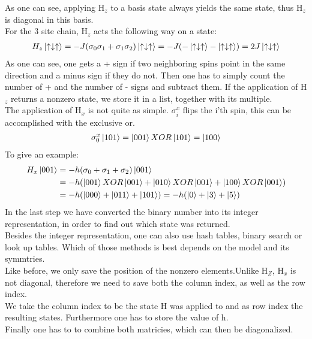 \documentclass{article}
\begin{document}
As one can see, applying H$_z$ to a basis state always yields the same state, thus H$_z$ is diagonal in this basis.\\
For the 3 site chain, H$_z$ acts the following way on a state:
\begin{align*}
H_z \ket{\uparrow \downarrow \uparrow} = -J(\sigma_0\sigma_1 + \sigma_1\sigma_2) \ket{\uparrow \downarrow \uparrow} = -J(-\ket{\uparrow \downarrow \uparrow} - \ket{\uparrow \downarrow \uparrow}) = 2J \ket{\uparrow \downarrow \uparrow}
\end{align*}
As one can see, one gets a + sign if two neighboring spins point in the same direction and a minus sign if they do not. Then one has to simply count the number of + and the number of - signs and subtract them.
If the application of H$_z$ returns a nonzero state, we store it in a list, together with its multiple.\\
The application of H$_x$ is not quite as simple. $\sigma_i^x$ flips the i'th spin, this can be accomplished with the exclusive or.
\begin{align*}
\sigma_0^x \ket{101} = \ket{001} XOR \ket{101} = \ket{100}
\end{align*}
To give an example:
\begin{align*}
H_x \ket{001} &= -h(\sigma_0 + \sigma_1 + \sigma_2)\ket{001} \\
&= -h(\ket{001}XOR \ket{001} + \ket{010}XOR \ket{001} + \ket{100}XOR \ket{001})\\
&= -h(\ket{000} +\ket{011} +\ket{101}) = -h(\ket{0} + \ket{3} +\ket{5})
\end{align*}
In the last step we have converted the binary number into its integer representation, in order to find out which state was returned.\\
Besides the integer representation, one can also use hash tables, binary search or look up tables. Which of those methods is best depends on the model and its symmtries.\\
Like before, we only save the position of the nonzero elements.Unlike H$_Z$, H$_{x}$ is not diagonal, therefore we need to save both the column index, as well as the row index.\\
We take the column index to be the state H was applied to and as row index the resulting states. Furthermore one has to store the value of h.\\
Finally one has to to combine both matricies, which can then be diagonalized.
\end{document}
